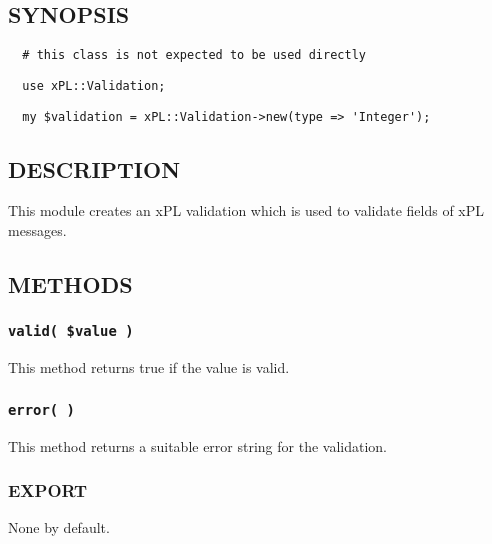 \subsection*{SYNOPSIS\label{xPL::Validation::Integer_SYNOPSIS}}
\begin{verbatim}
  # this class is not expected to be used directly
\end{verbatim}
\begin{verbatim}
  use xPL::Validation;
\end{verbatim}
\begin{verbatim}
  my $validation = xPL::Validation->new(type => 'Integer');
\end{verbatim}
\subsection*{DESCRIPTION\label{xPL::Validation::Integer_DESCRIPTION}}


This module creates an xPL validation which is used to validate fields
of xPL messages.

\subsection*{METHODS\label{xPL::Validation::Integer_METHODS}}
\subsubsection*{\texttt{valid( \$value )}\label{xPL::Validation::Integer_valid_value_}}


This method returns true if the value is valid.

\subsubsection*{\texttt{error( )}\label{xPL::Validation::Integer_error_}}


This method returns a suitable error string for the validation.

\subsubsection*{EXPORT\label{xPL::Validation::Integer_EXPORT}}


None by default.

